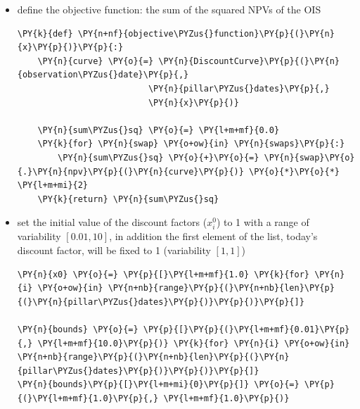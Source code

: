\begin{itemize}
\tightlist
\item
  define the objective function: the sum of the squared NPVs of the OIS

    \begin{tcolorbox}[breakable, size=fbox, boxrule=1pt, pad at break*=1mm,colback=cellbackground, colframe=cellborder]
\begin{Verbatim}[commandchars=\\\{\}]
\PY{k}{def} \PY{n+nf}{objective\PYZus{}function}\PY{p}{(}\PY{n}{x}\PY{p}{)}\PY{p}{:}
    \PY{n}{curve} \PY{o}{=} \PY{n}{DiscountCurve}\PY{p}{(}\PY{n}{observation\PYZus{}date}\PY{p}{,}
                          \PY{n}{pillar\PYZus{}dates}\PY{p}{,}
                          \PY{n}{x}\PY{p}{)}
    
    \PY{n}{sum\PYZus{}sq} \PY{o}{=} \PY{l+m+mf}{0.0}
    \PY{k}{for} \PY{n}{swap} \PY{o+ow}{in} \PY{n}{swaps}\PY{p}{:}
        \PY{n}{sum\PYZus{}sq} \PY{o}{+}\PY{o}{=} \PY{n}{swap}\PY{o}{.}\PY{n}{npv}\PY{p}{(}\PY{n}{curve}\PY{p}{)} \PY{o}{*}\PY{o}{*} \PY{l+m+mi}{2}
    \PY{k}{return} \PY{n}{sum\PYZus{}sq}
\end{Verbatim}
\end{tcolorbox}

\item
  set the initial value of the discount factors (\(x_i^0\)) to 1 with a
  range of variability \([ 0.01, 10]\), in addition the first element of
  the list, today's discount factor, will be fixed to 1 (variability
  \([1, 1]\))

    \begin{tcolorbox}[breakable, size=fbox, boxrule=1pt, pad at break*=1mm,colback=cellbackground, colframe=cellborder]
\begin{Verbatim}[commandchars=\\\{\}]
\PY{n}{x0} \PY{o}{=} \PY{p}{[}\PY{l+m+mf}{1.0} \PY{k}{for} \PY{n}{i} \PY{o+ow}{in} \PY{n+nb}{range}\PY{p}{(}\PY{n+nb}{len}\PY{p}{(}\PY{n}{pillar\PYZus{}dates}\PY{p}{)}\PY{p}{)}\PY{p}{]}

\PY{n}{bounds} \PY{o}{=} \PY{p}{[}\PY{p}{(}\PY{l+m+mf}{0.01}\PY{p}{,} \PY{l+m+mf}{10.0}\PY{p}{)} \PY{k}{for} \PY{n}{i} \PY{o+ow}{in} \PY{n+nb}{range}\PY{p}{(}\PY{n+nb}{len}\PY{p}{(}\PY{n}{pillar\PYZus{}dates}\PY{p}{)}\PY{p}{)}\PY{p}{]}
\PY{n}{bounds}\PY{p}{[}\PY{l+m+mi}{0}\PY{p}{]} \PY{o}{=} \PY{p}{(}\PY{l+m+mf}{1.0}\PY{p}{,} \PY{l+m+mf}{1.0}\PY{p}{)}
\end{Verbatim}
\end{tcolorbox}


\end{itemize}
